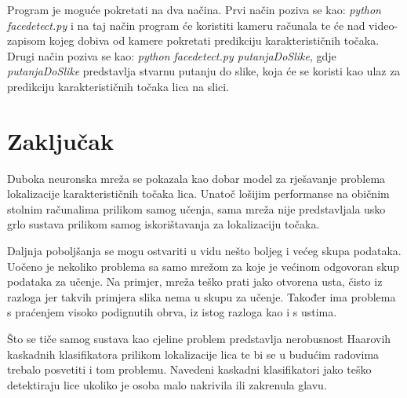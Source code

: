 \documentclass[times, utf8, zavrsni, numeric]{fer}
\begin{document}
Program je moguće pokretati na dva načina. Prvi način poziva se kao: \emph{python facedetect.py} i na taj način program će koristiti kameru računala te će nad video-zapisom kojeg dobiva od kamere pokretati predikciju karakterističnih točaka. Drugi način poziva se kao: \emph{python facedetect.py putanjaDoSlike}, gdje \emph{putanjaDoSlike} predstavlja stvarnu putanju do slike, koja će se koristi kao ulaz za predikciju karakterističnih točaka lica na slici.

\chapter{Zaključak}

Duboka neuronska mreža se pokazala kao dobar model za rješavanje problema lokalizacije karakterističnih točaka lica. Unatoč lošijim performanse na običnim stolnim računalima prilikom samog učenja, sama mreža nije predstavljala usko grlo sustava prilikom samog iskorištavanja za lokalizaciju točaka.

Daljnja poboljšanja se mogu ostvariti u vidu nešto boljeg i većeg skupa podataka. Uočeno je nekoliko problema sa samo mrežom za koje je većinom odgovoran skup podataka za učenje. Na primjer, mreža teško prati jako otvorena usta, čisto iz razloga jer takvih primjera slika nema u skupu za učenje. Također ima problema s praćenjem visoko podignutih obrva, iz istog razloga kao i s ustima.

Što se tiče samog sustava kao cjeline problem predstavlja nerobusnost Haarovih kaskadnih klasifikatora prilikom lokalizacije lica te bi se u budućim radovima trebalo posvetiti i tom problemu. Navedeni kaskadni klasifikatori jako teško detektiraju lice ukoliko je osoba malo nakrivila ili zakrenula glavu.



\end{document}
